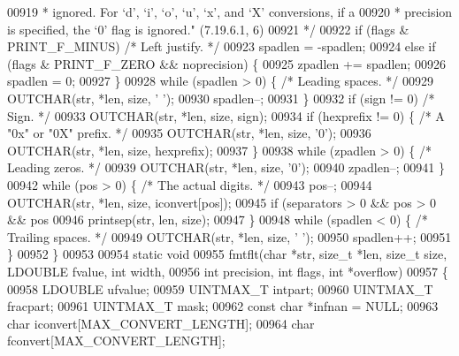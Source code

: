 \begin{DoxyCode}
{{{{{00919 \textcolor{comment}{     * ignored.  For `d', `i', `o', `u', `x', and `X' conversions, if a}
00920 \textcolor{comment}{     * precision is specified, the `0' flag is ignored." (7.19.6.1, 6)}
00921 \textcolor{comment}{     */}
00922     \textcolor{keywordflow}{if} (flags & PRINT\_F\_MINUS)  \textcolor{comment}{/* Left justify. */}
00923         spadlen = -spadlen;
00924     \textcolor{keywordflow}{else} \textcolor{keywordflow}{if} (flags & PRINT\_F\_ZERO && noprecision) \{
00925         zpadlen += spadlen;
00926         spadlen = 0;
00927     \}
00928     \textcolor{keywordflow}{while} (spadlen > 0) \{   \textcolor{comment}{/* Leading spaces. */}
00929         OUTCHAR(str, *len, size, \textcolor{charliteral}{' '});
00930         spadlen--;
00931     \}
00932     \textcolor{keywordflow}{if} (sign != 0)  \textcolor{comment}{/* Sign. */}
00933         OUTCHAR(str, *len, size, sign);
00934     \textcolor{keywordflow}{if} (hexprefix != 0) \{   \textcolor{comment}{/* A "0x" or "0X" prefix. */}
00935         OUTCHAR(str, *len, size, \textcolor{charliteral}{'0'});
00936         OUTCHAR(str, *len, size, hexprefix);
00937     \}
00938     \textcolor{keywordflow}{while} (zpadlen > 0) \{   \textcolor{comment}{/* Leading zeros. */}
00939         OUTCHAR(str, *len, size, \textcolor{charliteral}{'0'});
00940         zpadlen--;
00941     \}
00942     \textcolor{keywordflow}{while} (pos > 0) \{   \textcolor{comment}{/* The actual digits. */}
00943         pos--;
00944         OUTCHAR(str, *len, size, iconvert[pos]);
00945         \textcolor{keywordflow}{if} (separators > 0 && pos > 0 && pos %
00946             printsep(str, len, size);
00947     \}
00948     \textcolor{keywordflow}{while} (spadlen < 0) \{   \textcolor{comment}{/* Trailing spaces. */}
00949         OUTCHAR(str, *len, size, \textcolor{charliteral}{' '});
00950         spadlen++;
00951     \}
00952 \}
00953 
00954 \textcolor{keyword}{static} \textcolor{keywordtype}{void}
00955 fmtflt(\textcolor{keywordtype}{char} *str, \textcolor{keywordtype}{size\_t} *len, \textcolor{keywordtype}{size\_t} size, LDOUBLE fvalue, \textcolor{keywordtype}{int} width,
00956        \textcolor{keywordtype}{int} precision, \textcolor{keywordtype}{int} flags, \textcolor{keywordtype}{int} *overflow)
00957 \{
00958     LDOUBLE ufvalue;
00959     UINTMAX\_T intpart;
00960     UINTMAX\_T fracpart;
00961     UINTMAX\_T mask;
00962     \textcolor{keyword}{const} \textcolor{keywordtype}{char} *infnan = NULL;
00963     \textcolor{keywordtype}{char} iconvert[MAX\_CONVERT\_LENGTH];
00964     \textcolor{keywordtype}{char} fconvert[MAX\_CONVERT\_LENGTH];
}}}}}
\end{DoxyCode}
